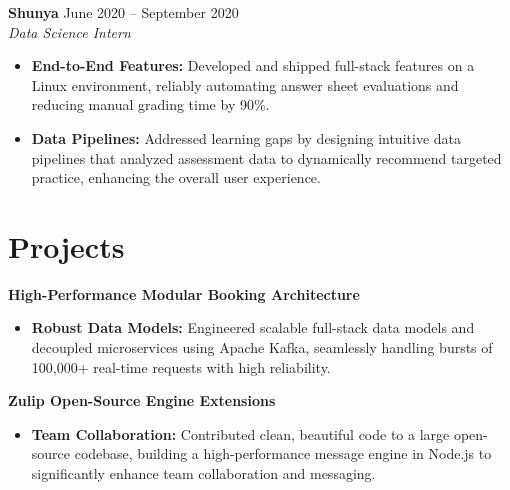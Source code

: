 \documentclass[11pt,a4paper]{article}
\begin{document}
\vspace{3pt}
\noindent
\textbf{Shunya} \hfill June 2020 -- September 2020 \\
\textit{Data Science Intern}
\begin{itemize}[leftmargin=*,noitemsep,topsep=0pt]
    \item \textbf{End-to-End Features:} Developed and shipped full-stack features on a Linux environment, reliably automating answer sheet evaluations and reducing manual grading time by 90\%.
    \item \textbf{Data Pipelines:} Addressed learning gaps by designing intuitive data pipelines that analyzed assessment data to dynamically recommend targeted practice, enhancing the overall user experience.
\end{itemize}

\vspace{-5pt}
\section{Projects}
\noindent
\textbf{High-Performance Modular Booking Architecture}
\begin{itemize}[leftmargin=*,noitemsep,topsep=0pt]
    \item \textbf{Robust Data Models:} Engineered scalable full-stack data models and decoupled microservices using Apache Kafka, seamlessly handling bursts of 100,000+ real-time requests with high reliability.
\end{itemize}

\vspace{3pt}
\noindent
\textbf{Zulip Open-Source Engine Extensions}
\begin{itemize}[leftmargin=*,noitemsep,topsep=0pt]
    \item \textbf{Team Collaboration:} Contributed clean, beautiful code to a large open-source codebase, building a high-performance message engine in Node.js to significantly enhance team collaboration and messaging.
\end{itemize}
\end{document}
